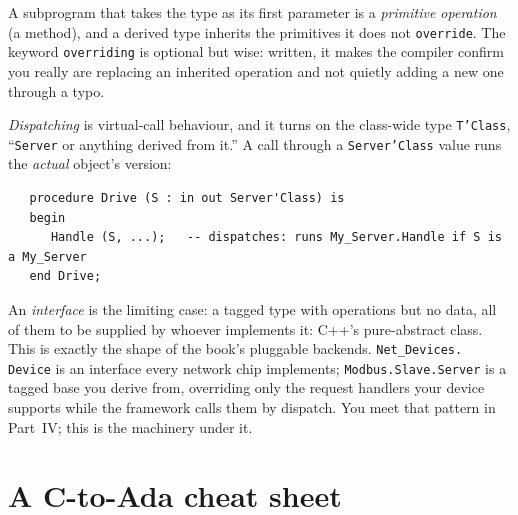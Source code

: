 A subprogram that takes the type as its first parameter is a \emph{primitive
operation} (a method), and a derived type inherits the primitives it does not
\texttt{override}. The keyword \texttt{overriding} is optional but wise: written, it
makes the compiler confirm you really are replacing an inherited operation and not
quietly adding a new one through a typo.

\emph{Dispatching} is virtual-call behaviour, and it turns on the class-wide type
\texttt{T'Class}, ``\texttt{Server} or anything derived from it.'' A call through a
\texttt{Server'Class} value runs the \emph{actual} object's version:

\begin{lstlisting}
   procedure Drive (S : in out Server'Class) is
   begin
      Handle (S, ...);   -- dispatches: runs My_Server.Handle if S is a My_Server
   end Drive;
\end{lstlisting}

An \emph{interface} is the limiting case: a tagged type with operations but no data,
all of them to be supplied by whoever implements it: C++'s pure-abstract class.
This is exactly the shape of the book's pluggable backends. \texttt{Net\_Devices.%
Device} is an interface every network chip implements; \texttt{Modbus.Slave.Server}
is a tagged base you derive from, overriding only the request handlers your device
supports while the framework calls them by dispatch. You meet that pattern in
Part~IV; this is the machinery under it.

\section{A C-to-Ada cheat sheet}

